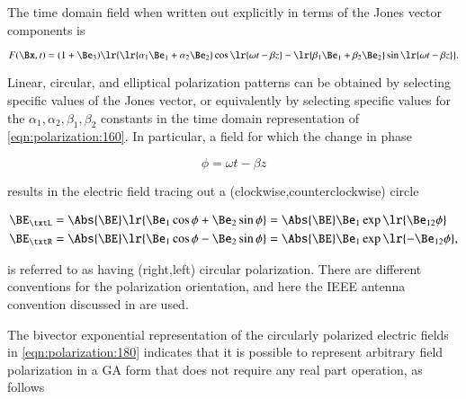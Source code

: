 

The time domain field when written out explicitly in terms of the Jones vector components is

\begin{dmath}\label{eqn:polarization:160}
F(\Bx, t) = (1 + \Be_3) \lr{
\lr{ \alpha_1 \Be_1 + \alpha_2 \Be_2 } \cos\lr{ \omega t - \beta z }
-\lr{ \beta_1 \Be_1 + \beta_2 \Be_2 } \sin\lr{ \omega t - \beta z }
}.
\end{dmath}

Linear, circular, and elliptical polarization patterns can be obtained by selecting specific values of the Jones vector, or equivalently by selecting specific values for the \( \alpha_1, \alpha_2, \beta_1, \beta_2 \) constants in the time domain representation of \cref{eqn:polarization:160}.
In particular,
a field for which the
change in phase

\begin{dmath}\label{eqn:polarization:520}
\phi = \omega t - \beta z
\end{dmath}

results in the electric field tracing out a (clockwise,counterclockwise) circle

\begin{dmath}\label{eqn:polarization:180}
\begin{aligned}
\BE_\txtL &= \Abs{\BE} \lr{ \Be_1 \cos\phi + \Be_2 \sin\phi } = \Abs{\BE} \Be_1 \exp\lr{  \Be_{12} \phi } \\
\BE_\txtR &= \Abs{\BE} \lr{ \Be_1 \cos\phi - \Be_2 \sin\phi } = \Abs{\BE} \Be_1 \exp\lr{ -\Be_{12} \phi },
\end{aligned}
\end{dmath}

is referred to as having
(right,left) circular polarization.
There are different conventions for the polarization orientation, and here the IEEE antenna convention discussed in \citep{balanis1989advanced} are used.


The bivector exponential representation of the circularly polarized electric fields in \cref{eqn:polarization:180} indicates that it is possible to represent arbitrary field polarization in a GA form that does not require any real part operation, as follows

